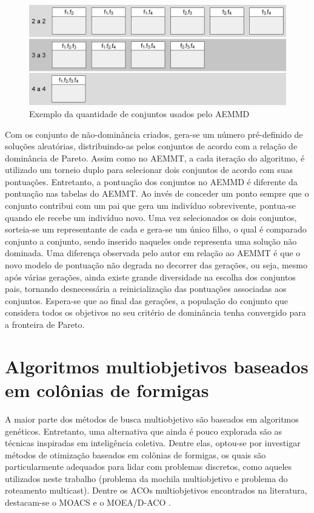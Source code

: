 \begin{figure}[!htbp]
	\label{fig_aemmd_tabelas}
	\centering
	\includegraphics[width=1\textwidth]{cap_otimizacao-multi/figs/aeemd-tabelas}
	\caption{Exemplo da quantidade de conjuntos usados pelo AEMMD}
\end{figure}

Com os conjunto de não-dominância criados, gera-se um número pré-definido de soluções aleatórias, distribuindo-as pelos conjuntos de acordo com a relação de dominância de Pareto. Assim como no AEMMT, a cada iteração do algoritmo, é utilizado um torneio duplo para selecionar dois conjuntos de acordo com suas pontuações. Entretanto, a pontuação dos conjuntos no AEMMD é diferente da pontuação nas tabelas do AEMMT. Ao invés de conceder um ponto sempre que o conjunto contribui com um pai que gera um indivíduo sobrevivente, pontua-se quando ele recebe um indivíduo novo. Uma vez selecionados os dois conjuntos, sorteia-se um representante de cada e gera-se um único filho, o qual é comparado conjunto a conjunto, sendo inserido naqueles onde representa uma solução não dominada. Uma diferença observada pelo autor em relação ao AEMMT é que o novo modelo de pontuação não degrada no decorrer das gerações, ou seja, mesmo após várias gerações, ainda existe grande diversidade na escolha dos conjuntos pais, tornando desnecessária a reinicialização das pontuações associadas aos conjuntos. Espera-se que ao final das gerações, a população do conjunto que considera todos os objetivos no seu critério de dominância tenha convergido para a fronteira de Pareto. 

\section{Algoritmos multiobjetivos baseados em colônias de formigas}

A maior parte dos métodos de busca multiobjetivo são baseados em algoritmos genéticos. Entretanto, uma alternativa que ainda é pouco explorada são as técnicas inspiradas em inteligência coletiva. Dentre elas, optou-se por investigar métodos de otimização baseados em colônias de formigas, os quais são particularmente adequados para lidar com problemas discretos, como aqueles utilizados neste trabalho (problema da mochila multiobjetivo e problema do roteamento multicast). Dentre os ACOs multiobjetivos encontrados na literatura, destacam-se o MOACS \cite{Baran2003} e o MOEA/D-ACO \cite{Ke2013}.


